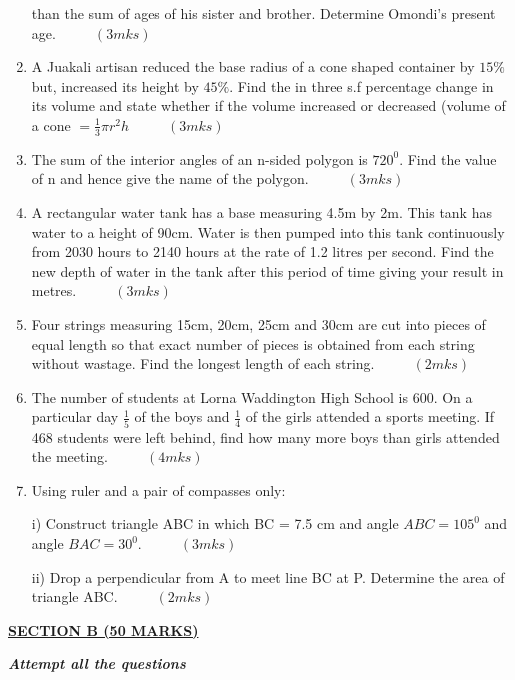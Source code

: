 \documentclass[
  a4paperpaper,
]{scrbook}
\begin{document}
\begin{tcolorbox}
\begin{enumerate}
  than the sum of ages of his sister and brother. Determine Omondi's
  present age. \(\hspace{1cm} (3mks)\)
\item
  A Juakali artisan reduced the base radius of a cone shaped container
  by \(15\%\) but, increased its height by \(45\%\). Find the in three
  s.f percentage change in its volume and state whether if the volume
  increased or decreased (volume of a cone \(=\frac{1}{3}\pi r^2h\)
  \(\hspace{1cm} (3mks)\)
\item
  The sum of the interior angles of an n-sided polygon is \(720^0\).
  Find the value of n and hence give the name of the polygon.
  \(\hspace{1cm} (3mks)\)
\item
  A rectangular water tank has a base measuring 4.5m by 2m. This tank
  has water to a height of 90cm. Water is then pumped into this tank
  continuously from 2030 hours to 2140 hours at the rate of 1.2 litres
  per second. Find the new depth of water in the tank after this period
  of time giving your result in metres. \(\hspace{1cm} (3mks)\)
\item
  Four strings measuring 15cm, 20cm, 25cm and 30cm are cut into pieces
  of equal length so that exact number of pieces is obtained from each
  string without wastage. Find the longest length of each string.
  \(\hspace{1cm} (2mks)\)
\item
  The number of students at Lorna Waddington High School is 600. On a
  particular day \(\frac{1}{5}\) of the boys and \(\frac{1}{4}\) of the
  girls attended a sports meeting. If 468 students were left behind,
  find how many more boys than girls attended the meeting.
  \(\hspace{1cm} (4mks)\)
\item
  Using ruler and a pair of compasses only:

  i) Construct triangle ABC in which BC = 7.5 cm and angle
  \(ABC = 105^0\) and angle \(BAC = 30^0\). \(\hspace{1cm} (3mks)\)

  ii) Drop a perpendicular from A to meet line BC at P. Determine the
  area of triangle ABC. \(\hspace{1cm} (2mks)\)
\end{enumerate}

\ul{\textbf{SECTION B (50 MARKS)}}

\textbf{\emph{Attempt all the questions}}


\end{tcolorbox}
\end{document}
